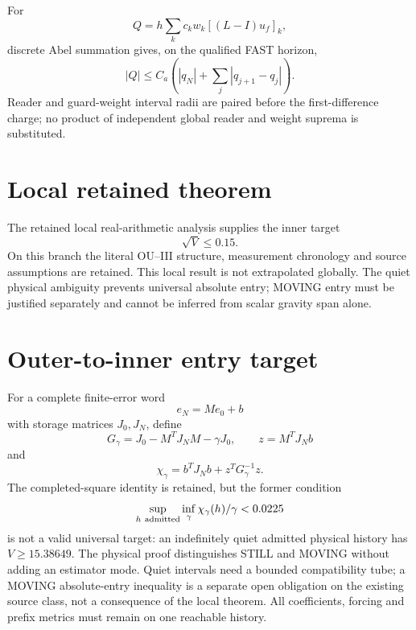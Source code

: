 \documentclass[journal]{IEEEtran}
\begin{document}
For
\[
Q=h\sum_kc_kw_k[(L-I)u_f]_k,
\]
discrete Abel summation gives, on the qualified FAST horizon,
\[
|Q|\le C_a\left(|q_N|+\sum_j|q_{j+1}-q_j|\right).
\]
Reader and guard-weight interval radii are paired before the first-difference charge; no product of independent global reader and weight suprema is substituted.

\section{Local retained theorem}
The retained local real-arithmetic analysis supplies the inner target
\[
\sqrt V\le0.15.
\]
On this branch the literal OU--III structure, measurement chronology and source assumptions are retained. This local result is not extrapolated globally. The quiet physical ambiguity prevents universal absolute entry; MOVING entry must be justified separately and cannot be inferred from scalar gravity span alone.

\section{Outer-to-inner entry target}
For a complete finite-error word
\[
e_N=Me_0+b
\]
with storage matrices \(J_0,J_N\), define
\[
G_\gamma=J_0-M^TJ_NM-\gamma J_0,\qquad
z=M^TJ_Nb
\]
and
\[
\chi_\gamma=b^TJ_Nb+z^TG_\gamma^{-1}z.
\]
The completed-square identity is retained, but the former condition
\[
\sup_{h\ {\rm admitted}}\inf_\gamma\chi_\gamma(h)/\gamma<0.0225
\]
is not a valid universal target: an indefinitely quiet admitted physical
history has \(V\ge15.38649\). The physical proof distinguishes STILL and
MOVING without adding an estimator mode. Quiet intervals need a bounded
compatibility tube; a MOVING absolute-entry inequality is a separate open
obligation on the existing source class, not a consequence of the local theorem.
All coefficients, forcing and prefix metrics must remain on one reachable history.
\end{document}
